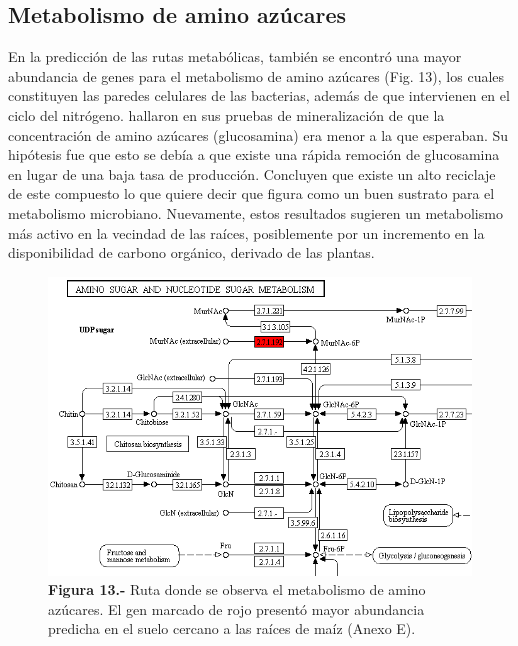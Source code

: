 \documentclass[12pt,letterpaper,oneside]{report}
\begin{document}
\subsection{Metabolismo de amino azúcares}
En la predicción de las rutas metabólicas, también se encontró una mayor abundancia de genes para el metabolismo de amino azúcares (Fig. 13), los cuales constituyen las paredes celulares de las bacterias, además de que intervienen en el ciclo del nitrógeno. \textcite{Roberts2007} hallaron en sus pruebas de mineralización de  que la concentración de amino azúcares (glucosamina) era menor a la que esperaban. Su hipótesis fue que esto se debía a que existe una rápida remoción de glucosamina en lugar de una baja tasa de producción. Concluyen que existe un alto reciclaje de este compuesto lo que quiere decir que figura como un buen sustrato para el metabolismo microbiano. Nuevamente, estos resultados sugieren un metabolismo más activo en la vecindad de las raíces, posiblemente por un incremento en la disponibilidad de carbono orgánico, derivado de las plantas.
\begin{figure}[!ht]
\centering
\includegraphics[width=15.59cm]{figuras/IMG_14}
\caption*{\textbf{Figura 13.-} Ruta donde se observa el metabolismo de amino azúcares. El gen marcado de rojo presentó mayor abundancia predicha en el suelo cercano a las raíces de maíz (Anexo E).}
\label{Figura 14}
\end{figure}
\newpage
\end{document}
